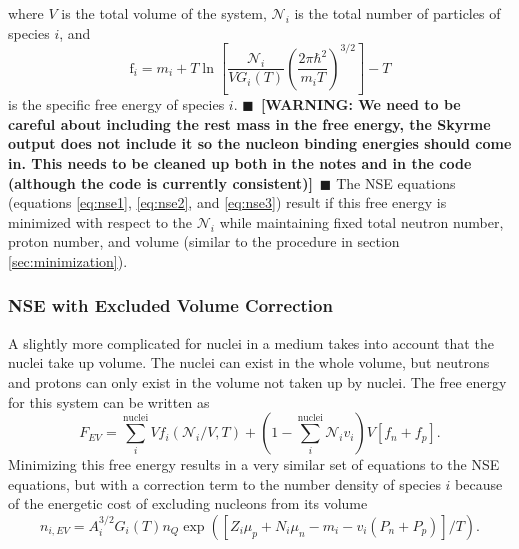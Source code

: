 \documentclass[11pt,letter]{article}
\newcommand{\warn}[1]{{$\blacksquare$~\textbf{\color{red}[WARNING: #1]}}~$\blacksquare$}
\begin{document}
where $V$ is the total volume of the system, $\mathcal{N}_i$ is the total
number of particles of species $i$, and 
\begin{equation}
\mathrm{f}_i = m_i + T \ln \left[\frac{\mathcal{N}_i}{V G_i(T)} 
\left(\frac{2 \pi \hbar^2}{m_i T} \right)^{3/2}  \right] - T
\end{equation}
is the specific free energy of species $i$. \warn{We need to be careful about
including the rest mass in the free energy,  the Skyrme output does not include
it so the nucleon binding energies should come in.  This needs to be cleaned up
both in the notes and in the code (although the code is currently consistent)}
The NSE equations (equations \ref{eq:nse1}, \ref{eq:nse2}, and \ref{eq:nse3})
result if this free energy is minimized with respect to the $\mathcal{N}_i$
while maintaining fixed total neutron number, proton number, and volume (similar
to the procedure in section \ref{sec:minimization}).  

\subsubsection{NSE with Excluded Volume Correction}
A slightly more complicated for nuclei in a medium takes into account that the nuclei
take up volume.  The nuclei can exist in the whole volume, but neutrons and protons 
can only exist in the volume not taken up by nuclei.  The free energy for this system
can be written as 
\begin{equation}
F_{EV} = \sum_i^{\textrm{nuclei}} V f_i(\mathcal{N}_i/V, T) 
+ \left (1 - \sum_i^{\textrm{nuclei}}\mathcal{N}_i v_i\right) V \left[f_n + f_p\right].
\end{equation}
Minimizing this free energy results in a very similar set of equations to the NSE 
equations, but with a correction term to the number density of species $i$ because of 
the energetic cost of excluding nucleons from its volume 
\begin{equation}
n_{i,EV} = A_i^{3/2} G_i(T) n_Q \exp\left(\left[Z_i \mu_p + N_i \mu_n - m_i - v_i(P_n + P_p) \right]/T\right).
\end{equation} 
\end{document}
